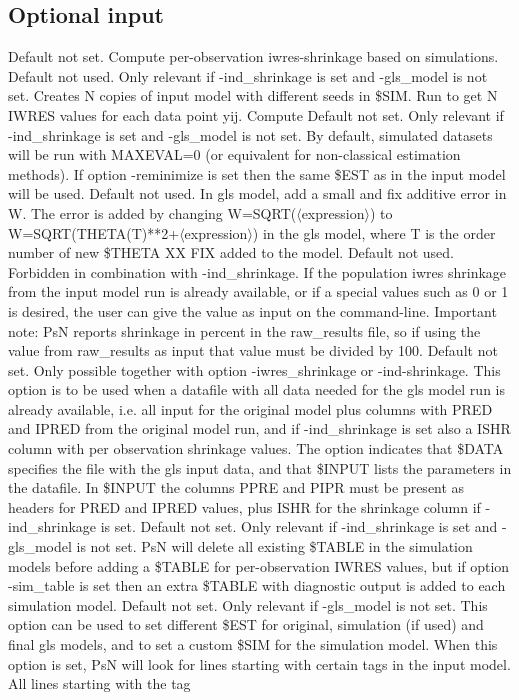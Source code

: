 \subsection{Optional input}

\begin{optionlist}
Default not set. Compute per-observation iwres-shrinkage based on simulations. 
\nextopt
{}
Default not used. Only relevant if -ind\_shrinkage is set and -gls\_model is not set. Creates N copies of input model with different seeds in \$SIM. Run to get N IWRES values for each data point yij. Compute  
\nextopt
{}
Default not set. Only relevant if -ind\_shrinkage is set and -gls\_model is not set. By default, simulated datasets will be run with MAXEVAL=0 (or equivalent for non-classical estimation methods). If option -reminimize is set then the same \$EST as in the input model will be used. 
\nextopt
{}
Default not used. In gls model, add a small and fix additive error in W. The error is added by changing W=SQRT($\langle$expression$\rangle$) to W=SQRT(THETA(T)**2+$\langle$expression$\rangle$) in the gls model, where T is the order number of new \$THETA XX FIX added to the model. 
\nextopt
{}
Default not used. Forbidden in combination with -ind\_shrinkage. If the population iwres shrinkage from the input model run is already available, or if a special values such as 0 or 1 is desired, the user can give the value as input on the command-line. Important note: PsN reports shrinkage in percent in the raw\_results file, so if using the value from raw\_results as input that value must be divided by 100.   
\nextopt
{}
Default not set. Only possible together with option -iwres\_shrinkage or -ind-shrinkage. This option is to be used when a datafile with all data needed for the gls model run is already available, i.e. all input for the original model plus columns with PRED and IPRED from the original model run, and if -ind\_shrinkage is set also a ISHR column with per observation shrinkage values. The option indicates that \$DATA specifies the file with the gls input data, and that \$INPUT lists the parameters in the datafile. In \$INPUT the columns PPRE and PIPR must be present as headers for PRED and IPRED values, plus ISHR for the shrinkage column if -ind\_shrinkage is set. 
\nextopt
{}
Default not set. Only relevant if -ind\_shrinkage is set and -gls\_model is not set. PsN will delete all existing \$TABLE in the simulation models before adding a \$TABLE for per-observation IWRES values, but if option -sim\_table is set then an extra \$TABLE with diagnostic output is added to each simulation model. 
\nextopt
{}
Default not set. Only relevant if -gls\_model is not set. This option can be used to set different \$EST for original, simulation (if used) and final gls models, and to set a custom \$SIM for the simulation model. When this option is set, PsN will look for lines starting with certain tags in the input model. All lines starting with the tag



\end{optionlist}
